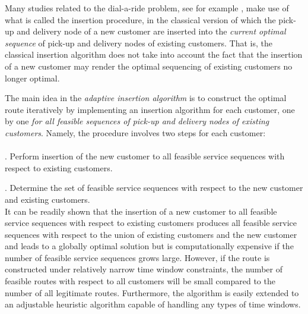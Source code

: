 \documentclass[dissertation,draft*]{aaltoseries}
\begin{document}
Many studies related to the dial-a-ride problem, see for example \cite{jaw,madsen,diana,wong},
make use of what is called the insertion procedure, in the classical version of which   
the pick-up and delivery node of a new customer are inserted into the 
\emph{current optimal sequence} of pick-up and delivery nodes of existing customers.
That is, the classical insertion algorithm does not take into account the fact that %
the insertion of a new customer may render
the optimal sequencing of existing customers no longer optimal.

The main idea in the \emph{adaptive insertion algorithm} is to construct the optimal route iteratively by implementing 
an insertion algorithm for each customer, one by one \emph{for all feasible sequences 
of pick-up and delivery nodes of existing customers}.
Namely, the procedure involves two steps for each customer:
\\
\\
.	Perform insertion of the new customer to all feasible service sequences with respect to
	existing customers.

.	Determine the set of feasible service sequences with respect to the new customer and existing customers.
\\

It can be readily shown that the insertion of a new customer to all feasible service sequences with respect to 
existing customers 
produces all feasible service sequences with respect to the union of existing customers 
and the new customer and leads to a globally optimal solution but is computationally expensive
if the number of feasible service sequences grows large. However, if the route is constructed under relatively narrow time window constraints,
the number of feasible routes with respect to all customers
will be small compared to the number of all legitimate routes. 
Furthermore, the algorithm is easily extended to an adjustable heuristic algorithm
capable of handling any types of time windows. 
\end{document}
